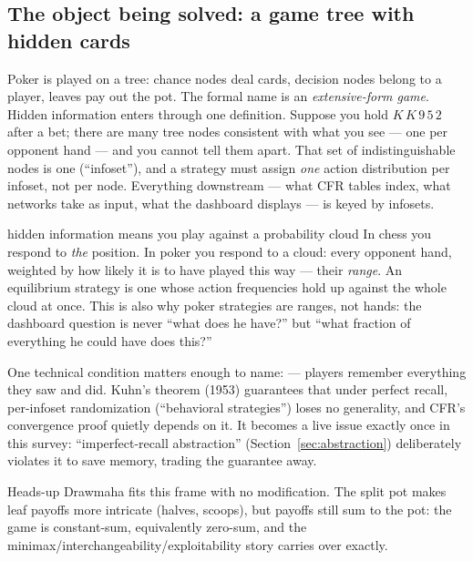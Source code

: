 \subsection*{The object being solved: a game tree with hidden cards}

Poker is played on a tree: chance nodes deal cards, decision nodes belong to a player, leaves pay out the pot. The formal name is an \emph{extensive-form game}. Hidden information enters through one definition. Suppose you hold $K\,K\,9\,5\,2$ after a bet; there are many tree nodes consistent with what you see --- one per opponent hand --- and you cannot tell them apart. That set of indistinguishable nodes is one  (``infoset''), and a strategy must assign \emph{one} action distribution per infoset, not per node. Everything downstream --- what CFR tables index, what networks take as input, what the dashboard displays --- is keyed by infosets.

\begin{intuition}{hidden information means you play against a probability cloud}
In chess you respond to \emph{the} position. In poker you respond to a cloud: every opponent hand, weighted by how likely it is to have played this way --- their \emph{range}. An equilibrium strategy is one whose action frequencies hold up against the whole cloud at once. This is also why poker strategies are ranges, not hands: the dashboard question is never ``what does he have?'' but ``what fraction of everything he could have does this?''
\end{intuition}

One technical condition matters enough to name:  --- players remember everything they saw and did. Kuhn's theorem (1953) guarantees that under perfect recall, per-infoset randomization (``behavioral strategies'') loses no generality, and CFR's convergence proof quietly depends on it. It becomes a live issue exactly once in this survey: ``imperfect-recall abstraction'' (Section~\ref{sec:abstraction}) deliberately violates it to save memory, trading the guarantee away.

Heads-up Drawmaha fits this frame with no modification. The split pot makes leaf payoffs more intricate (halves, scoops), but payoffs still sum to the pot: the game is constant-sum, equivalently zero-sum, and the minimax/interchangeability/exploitability story carries over exactly.
